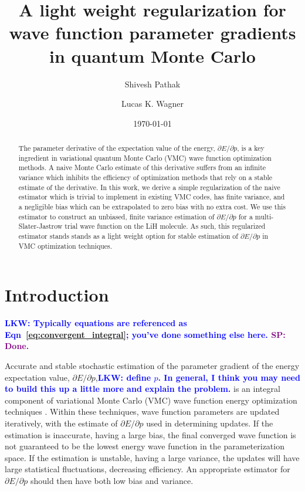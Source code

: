 \documentclass[twocolumn]{revtex4-1}
\newcommand{\lucas}[1]{\textbf{\textcolor{blue}{LKW: #1}}}
\newcommand{\shivesh}[1]{\textbf{\textcolor{purple}{SP: #1}}}
\begin{document}
\title{A light weight regularization for wave function parameter gradients
\\ in quantum Monte Carlo}

\author{Shivesh Pathak}

\author{Lucas K. Wagner}

\date{\today}
\begin{abstract}
The parameter derivative of the expectation value of the energy, $\partial E/\partial p$, is a key ingredient in variational quantum Monte Carlo (VMC) wave function optimization methods.
A naive Monte Carlo estimate of this derivative suffers from an infinite variance which inhibits the efficiency of optimization methods that rely on a stable estimate of the derivative.
In this work, we derive a simple regularization of the naive estimator which is trivial to implement in existing VMC codes, has finite variance, and a negligible bias which can be extrapolated to zero bias with no extra cost.
We use this estimator to construct an unbiased, finite variance estimation of $\partial E/\partial p$ for a multi-Slater-Jastrow trial wave function on the LiH molecule.
As such, this regularized estimator stands stands as a light weight option for stable estimation of $\partial E/\partial p$ in VMC optimization techniques.
\end{abstract}
\maketitle 

\section{Introduction}

\lucas{Typically equations are referenced as Eqn~\ref{eq:convergent_integral}; you've done something else here. } 
\shivesh{Done.}

Accurate and stable stochastic estimation of the parameter gradient of the energy expectation value, $\partial E/\partial p$,\lucas{define $p$. In general, I think you may need to build this up a little more and explain the problem.} is an integral component of variational Monte Carlo (VMC) wave function energy optimization techniques \cite{PhysRevB.64.024512, doi:10.1063/1.1604379, Toulouse2007, Umrigar2005, Umrigar2007, Toulouse2008}.
Within these techniques, wave function parameters are updated iteratively, with the estimate of $\partial E/\partial p$ used in determining updates.
If the estimation is inaccurate, having a large bias, the final converged wave function is not guaranteed to be the lowest energy wave function in the parameterization space.
If the estimation is unstable, having a large variance, the updates will have large statistical fluctuations, decreasing efficiency.
An appropriate estimator for $\partial E/ \partial p$ should then have both low bias and variance.
\end{document}
